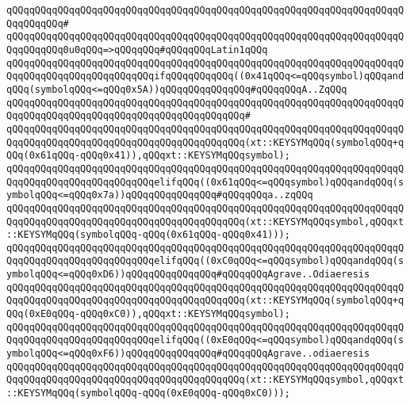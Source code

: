 \verb|qQQqqQQqqQQqqQQqqQQqqQQqqQQqqQQqqQQqqQQqqQQqqQQqqQQqqQQqqQQqqQQqqQQqqQQqqQQqqQQq#|\newline
\verb|qQQqqQQqqQQqqQQqqQQqqQQqqQQqqQQqqQQqqQQqqQQqqQQqqQQqqQQqqQQqqQQqqQQqqQQqqQQqqQQq0u0qQQq=>qQQqqQQq#qQQqqQQqLatin1qQQq|\newline
\newline
\verb|qQQqqQQqqQQqqQQqqQQqqQQqqQQqqQQqqQQqqQQqqQQqqQQqqQQqqQQqqQQqqQQqqQQqqQQqqQQqqQQqqQQqqQQqqQQqqQQqifqQQqqQQqqQQq((0x41qQQq<=qQQqsymbol)qQQqandqQQq(symbolqQQq<=qQQq0x5A))qQQqqQQqqQQqqQQq#qQQqqQQqA..ZqQQq|\newline
\verb|qQQqqQQqqQQqqQQqqQQqqQQqqQQqqQQqqQQqqQQqqQQqqQQqqQQqqQQqqQQqqQQqqQQqqQQqqQQqqQQqqQQqqQQqqQQqqQQqqQQqqQQqqQQqqQQq#|\newline
\verb|qQQqqQQqqQQqqQQqqQQqqQQqqQQqqQQqqQQqqQQqqQQqqQQqqQQqqQQqqQQqqQQqqQQqqQQqqQQqqQQqqQQqqQQqqQQqqQQqqQQqqQQqqQQqqQQq(xt::KEYSYMqQQq(symbolqQQq+qQQq(0x61qQQq-qQQq0x41)),qQQqxt::KEYSYMqQQqsymbol);|\newline
\newline
\verb|qQQqqQQqqQQqqQQqqQQqqQQqqQQqqQQqqQQqqQQqqQQqqQQqqQQqqQQqqQQqqQQqqQQqqQQqqQQqqQQqqQQqqQQqqQQqqQQqelifqQQq((0x61qQQq<=qQQqsymbol)qQQqandqQQq(symbolqQQq<=qQQq0x7a))qQQqqQQqqQQqqQQq#qQQqqQQqa..zqQQq|\newline
\newline
\verb|qQQqqQQqqQQqqQQqqQQqqQQqqQQqqQQqqQQqqQQqqQQqqQQqqQQqqQQqqQQqqQQqqQQqqQQqqQQqqQQqqQQqqQQqqQQqqQQqqQQqqQQqqQQqqQQq(xt::KEYSYMqQQqsymbol,qQQqxt::KEYSYMqQQq(symbolqQQq-qQQq(0x61qQQq-qQQq0x41)));|\newline
\newline
\verb|qQQqqQQqqQQqqQQqqQQqqQQqqQQqqQQqqQQqqQQqqQQqqQQqqQQqqQQqqQQqqQQqqQQqqQQqqQQqqQQqqQQqqQQqqQQqqQQqelifqQQq((0xC0qQQq<=qQQqsymbol)qQQqandqQQq(symbolqQQq<=qQQq0xD6))qQQqqQQqqQQqqQQq#qQQqqQQqAgrave..Odiaeresis|\newline
\newline
\verb|qQQqqQQqqQQqqQQqqQQqqQQqqQQqqQQqqQQqqQQqqQQqqQQqqQQqqQQqqQQqqQQqqQQqqQQqqQQqqQQqqQQqqQQqqQQqqQQqqQQqqQQqqQQqqQQq(xt::KEYSYMqQQq(symbolqQQq+qQQq(0xE0qQQq-qQQq0xC0)),qQQqxt::KEYSYMqQQqsymbol);|\newline
\newline
\verb|qQQqqQQqqQQqqQQqqQQqqQQqqQQqqQQqqQQqqQQqqQQqqQQqqQQqqQQqqQQqqQQqqQQqqQQqqQQqqQQqqQQqqQQqqQQqqQQqelifqQQq((0xE0qQQq<=qQQqsymbol)qQQqandqQQq(symbolqQQq<=qQQq0xF6))qQQqqQQqqQQqqQQq#qQQqqQQqAgrave..odiaeresis|\newline
\newline
\verb|qQQqqQQqqQQqqQQqqQQqqQQqqQQqqQQqqQQqqQQqqQQqqQQqqQQqqQQqqQQqqQQqqQQqqQQqqQQqqQQqqQQqqQQqqQQqqQQqqQQqqQQqqQQqqQQq(xt::KEYSYMqQQqsymbol,qQQqxt::KEYSYMqQQq(symbolqQQq-qQQq(0xE0qQQq-qQQq0xC0)));|\newline

